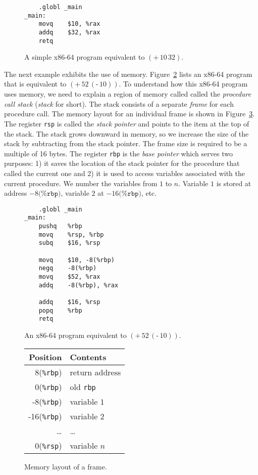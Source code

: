 \documentclass[12pt]{book}
\newcommand{\key}[1]{\texttt{#1}}
\newcommand{\UNIOP}[2]{(\key{#1}\,#2)}
\newcommand{\BINOP}[3]{(\key{#1}\,#2\,#3)}
\begin{document}
\begin{figure}[htbp]
\centering
\begin{minipage}{0.6\textwidth}
\begin{lstlisting}
	.globl _main
_main:
	movq	$10, %rax
	addq	$32, %rax
	retq
\end{lstlisting}
\end{minipage}
\caption{A simple x86-64 program equivalent to $\BINOP{+}{10}{32}$.}
\label{fig:p0-x86}
\end{figure}

The next example exhibits the use of memory.  Figure~\ref{fig:p1-x86}
lists an x86-64 program that is equivalent to $\BINOP{+}{52}{
  \UNIOP{-}{10} }$. To understand how this x86-64 program uses memory,
we need to explain a region of memory called called the
\emph{procedure call stack} (\emph{stack} for short). The stack
consists of a separate \emph{frame} for each procedure call. The
memory layout for an individual frame is shown in
Figure~\ref{fig:frame}.  The register \key{rsp} is called the
\emph{stack pointer} and points to the item at the top of the
stack. The stack grows downward in memory, so we increase the size of
the stack by subtracting from the stack pointer. The frame size is
required to be a multiple of 16 bytes. The register \key{rbp} is the
\emph{base pointer} which serves two purposes: 1) it saves the
location of the stack pointer for the procedure that called the
current one and 2) it is used to access variables associated with the
current procedure. We number the variables from $1$ to $n$. Variable
$1$ is stored at address $-8\key{(\%rbp)}$, variable $2$ at
$-16\key{(\%rbp)}$, etc.

\begin{figure}
\centering
\begin{minipage}{0.6\textwidth}
\begin{lstlisting}
	.globl _main
_main:
	pushq	%rbp
	movq	%rsp, %rbp
	subq	$16, %rsp

	movq	$10, -8(%rbp)
	negq	-8(%rbp)
	movq	$52, %rax
	addq	-8(%rbp), %rax

	addq	$16, %rsp
	popq	%rbp
	retq
\end{lstlisting}
\end{minipage}
\caption{An x86-64 program equivalent to $\BINOP{+}{52}{\UNIOP{-}{10} }$.}
\label{fig:p1-x86}
\end{figure}


\begin{figure}
\centering
\begin{tabular}{|r|l|} \hline
Position & Contents \\ \hline
8(\key{\%rbp}) & return address \\
0(\key{\%rbp}) & old \key{rbp} \\
-8(\key{\%rbp}) & variable $1$ \\
-16(\key{\%rbp}) & variable $2$ \\
 \ldots  & \ldots \\
0(\key{\%rsp}) & variable $n$\\ \hline
\end{tabular}

\caption{Memory layout of a frame.}
\label{fig:frame}
\end{figure}
\end{document}
